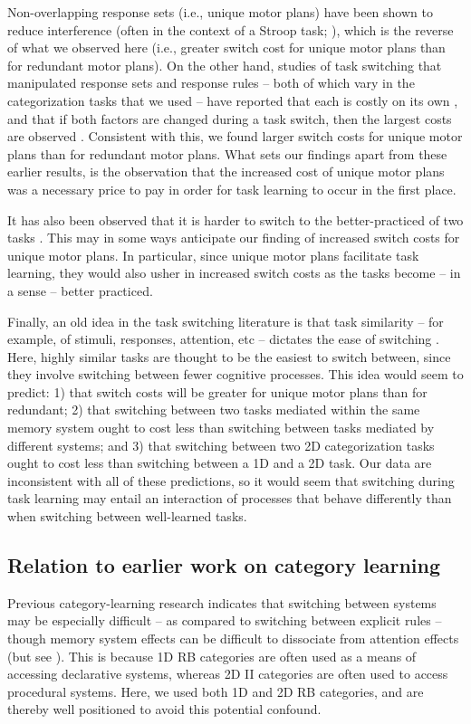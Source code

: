 \documentclass[doc, floatsintext]{apa7}
\begin{document}
Non-overlapping response sets (i.e., unique motor plans)
have been shown to reduce interference (often in the context
of a Stroop task; \cite{klein_semantic_1964, mayr_age_2001,
redding_stroop_1977, yeung_switching_2003}), which is the
reverse of what we observed here (i.e., greater switch cost
for unique motor plans than for redundant motor plans). On
the other hand, studies of task switching that manipulated
response sets and response rules -- both of which vary in
the categorization tasks that we used -- have reported that
each is costly on its own \parencite{philipp_role_2011,
philipp_differential_2013}, and that if both factors are
changed during a task switch, then the largest costs are
observed \parencite{philipp_integration_2010}. Consistent
with this, we found larger switch costs for unique motor
plans than for redundant motor plans. What sets our findings
apart from these earlier results, is the observation that
the increased cost of unique motor plans was a necessary
price to pay in order for task learning to occur in the
first place.

It has also been observed that it is harder to switch to the
better-practiced of two tasks
\parencite{allport_shifting_1994, yeung_switching_2003}.
This may in some ways anticipate our finding of increased
switch costs for unique motor plans. In particular, since
unique motor plans facilitate task learning, they would also
usher in increased switch costs as the tasks become -- in a
sense -- better practiced.

Finally, an old idea in the task switching literature is
that task similarity -- for example, of stimuli, responses,
attention, etc -- dictates the ease of switching
\parencite{arrington_tasks_2003}. Here, highly similar tasks
are thought to be the easiest to switch between, since they
involve switching between fewer cognitive processes.  This
idea would seem to predict: 1) that switch costs will be
greater for unique motor plans than for redundant; 2) that
switching between two tasks mediated within the same memory
system ought to cost less than switching between tasks
mediated by different systems; and 3) that switching between
two 2D categorization tasks ought to cost less than
switching between a 1D and a 2D task. Our data are
inconsistent with all of these predictions, so it would seem
that switching during task learning may entail an
interaction of processes that behave differently than when
switching between well-learned tasks.

\subsection{Relation to earlier work on category learning}
Previous category-learning research indicates that switching
between systems may be especially difficult -- as compared
to switching between explicit rules -- though memory system
effects can be difficult to dissociate from attention
effects (but see \cite{smith_implicit_2012,
ashby_dissociations_2020}). This is because 1D RB categories
are often used as a means of accessing declarative systems,
whereas 2D II categories are often used to access procedural
systems. Here, we used both 1D and 2D RB categories, and are
thereby well positioned to avoid this potential confound.
\end{document}
